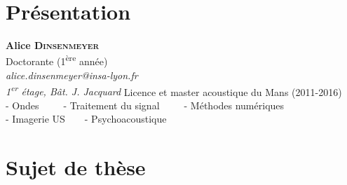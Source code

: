 \section{Présentation}


\begin{frame}
	\begin{center}
		\textbf{Alice \textsc{Dinsenmeyer}}\\
		\footnotesize{Doctorante (1\textsuperscript{ère} année)\\[0.5cm]
		\textit{alice.dinsenmeyer@insa-lyon.fr\\
		1\textsuperscript{er} étage, Bât. J. Jacquard}}
		\vfill
		\normalsize
		Licence et master acoustique du Mans (2011-2016)\\[0.3cm]
		- Ondes~~~~~- Traitement du signal~~~~~- Méthodes numériques\\
		- Imagerie US~~~~- Psychoacoustique	
	\end{center}


	

\end{frame}

\section{Sujet de thèse}


